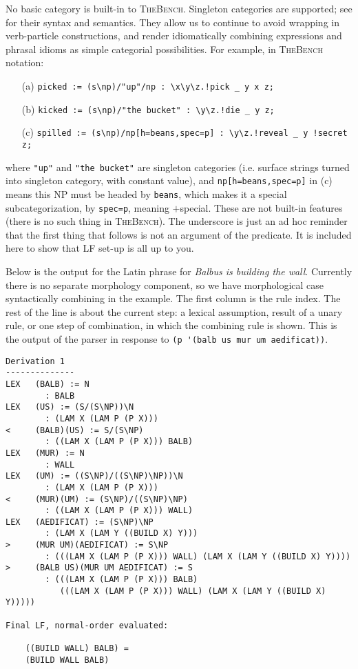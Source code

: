 \documentclass[11pt]{article}
\newcommand{\tool}{\textsc{TheBench}}
\begin{document}
No basic category is built-in to \tool.
{Singleton categories are  supported; see \cite{bozs:18} for their syntax and semantics. They allow us to continue to avoid wrapping in verb-particle
constructions, and render idiomatically combining expressions and phrasal idioms as simple categorial possibilities. For example, in \tool\, notation:}

\begin{itemize}
\item[(a)] \verb|picked := (s\np)/"up"/np : \x\y\z.!pick _ y x z;|
\item[(b)] \verb|kicked := (s\np)/"the bucket" : \y\z.!die _ y z;|
\item[(c)] \verb|spilled := (s\np)/np[h=beans,spec=p] : \y\z.!reveal _ y !secret z;|
\end{itemize}
{where} \verb|"up"| {and} \verb|"the bucket"| 
{are singleton categories (i.e. surface
strings turned into singleton category, with constant value), and} \verb|np[h=beans,spec=p]| 
{in (c) means
this NP must be headed by} \verb|beans|, {which makes it a special
subcategorization, by} \verb|spec=p|, {meaning $+$special. These are not built-in features (there is no such thing in \tool).
The underscore is just an ad hoc reminder that
the first thing that follows is not an argument of the predicate.
It is included here to show that LF set-up is all up to you.}

Below is the output for the Latin phrase for \emph{Balbus is building the wall}. 
{Currently there is no separate morphology component, so we have morphological case syntactically combining in the example.}
The first column is the rule index. 
The rest of the line is about the current step: a lexical assumption, result of a unary rule, or one step of combination, in which the combining rule is shown. This is the output of the parser in response to \verb+(p '(balb us mur um aedificat))+.

{\scriptsize
\begin{verbatim}
Derivation 1
--------------
LEX   (BALB) := N
        : BALB
LEX   (US) := (S/(S\NP))\N
        : (LAM X (LAM P (P X)))
<     (BALB)(US) := S/(S\NP)
        : ((LAM X (LAM P (P X))) BALB)
LEX   (MUR) := N
        : WALL
LEX   (UM) := ((S\NP)/((S\NP)\NP))\N
        : (LAM X (LAM P (P X)))
<     (MUR)(UM) := (S\NP)/((S\NP)\NP)
        : ((LAM X (LAM P (P X))) WALL)
LEX   (AEDIFICAT) := (S\NP)\NP
        : (LAM X (LAM Y ((BUILD X) Y)))
>     (MUR UM)(AEDIFICAT) := S\NP
        : (((LAM X (LAM P (P X))) WALL) (LAM X (LAM Y ((BUILD X) Y))))
>     (BALB US)(MUR UM AEDIFICAT) := S
        : (((LAM X (LAM P (P X))) BALB)
           (((LAM X (LAM P (P X))) WALL) (LAM X (LAM Y ((BUILD X) Y)))))

Final LF, normal-order evaluated:

    ((BUILD WALL) BALB) =
    (BUILD WALL BALB)
\end{verbatim}}
\end{document}
